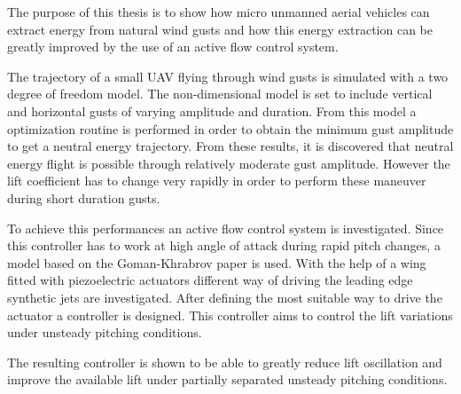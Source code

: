 \par The purpose of this thesis is to show how micro unmanned aerial vehicles can extract energy
from natural wind gusts and how this energy extraction can be greatly improved by the use of
an active flow control system.

\par The trajectory of a small UAV flying through wind gusts is simulated with a two degree of freedom model.
The non-dimensional model is set to include vertical and horizontal gusts of varying amplitude and duration.
From this model a optimization routine is performed in order to obtain the minimum gust amplitude to get a neutral energy trajectory.
From these results, it is discovered that neutral energy flight is possible through relatively moderate gust amplitude.
However the lift coefficient has to change very rapidly in order to perform these maneuver during short duration gusts. 

\par To achieve this performances an active flow control system is investigated.
Since this controller has to work at high angle of attack during rapid pitch changes, a model based on the Goman-Khrabrov paper \cite{GK} is used.
With the help of a wing fitted with piezoelectric actuators different way of driving the leading edge synthetic jets are investigated.
After defining the most suitable way to drive the actuator a controller is designed. 
This controller aims to control the lift variations under unsteady pitching conditions.

\par The resulting controller is shown to be able to greatly reduce lift oscillation and improve the available lift under partially separated unsteady pitching conditions.
